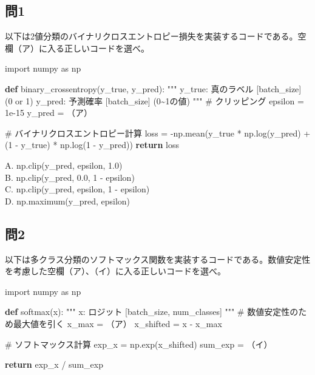 \documentclass[
  letterpaper,
  DIV=11,
  numbers=noendperiod]{scrreprt}
\newenvironment{Shaded}{\begin{snugshade}}{\end{snugshade}}
\newcommand{\CommentTok}[1]{\textcolor[rgb]{0.37,0.37,0.37}{#1}}
\newcommand{\ControlFlowTok}[1]{\textcolor[rgb]{0.00,0.23,0.31}{\textbf{#1}}}
\newcommand{\DecValTok}[1]{\textcolor[rgb]{0.68,0.00,0.00}{#1}}
\newcommand{\FloatTok}[1]{\textcolor[rgb]{0.68,0.00,0.00}{#1}}
\newcommand{\ImportTok}[1]{\textcolor[rgb]{0.00,0.46,0.62}{#1}}
\newcommand{\KeywordTok}[1]{\textcolor[rgb]{0.00,0.23,0.31}{\textbf{#1}}}
\newcommand{\NormalTok}[1]{\textcolor[rgb]{0.00,0.23,0.31}{#1}}
\newcommand{\OperatorTok}[1]{\textcolor[rgb]{0.37,0.37,0.37}{#1}}
\begin{document}
\subsection{問1}\label{ux554f1}

以下は2値分類のバイナリクロスエントロピー損失を実装するコードである。空欄（ア）に入る正しいコードを選べ。

\begin{Shaded}
\begin{Highlighting}[]
\ImportTok{import}\NormalTok{ numpy }\ImportTok{as}\NormalTok{ np}

\KeywordTok{def}\NormalTok{ binary\_crossentropy(y\_true, y\_pred):}
    \CommentTok{"""}
\CommentTok{    y\_true: 真のラベル [batch\_size] (0 or 1)}
\CommentTok{    y\_pred: 予測確率 [batch\_size] (0\textasciitilde{}1の値)}
\CommentTok{    """}
    \CommentTok{\# クリッピング}
\NormalTok{    epsilon }\OperatorTok{=} \FloatTok{1e{-}15}
\NormalTok{    y\_pred }\OperatorTok{=}\NormalTok{ （ア）}
    
    \CommentTok{\# バイナリクロスエントロピー計算}
\NormalTok{    loss }\OperatorTok{=} \OperatorTok{{-}}\NormalTok{np.mean(y\_true }\OperatorTok{*}\NormalTok{ np.log(y\_pred) }\OperatorTok{+}\NormalTok{ (}\DecValTok{1} \OperatorTok{{-}}\NormalTok{ y\_true) }\OperatorTok{*}\NormalTok{ np.log(}\DecValTok{1} \OperatorTok{{-}}\NormalTok{ y\_pred))}
    \ControlFlowTok{return}\NormalTok{ loss}
\end{Highlighting}
\end{Shaded}

A. np.clip(y\_pred, epsilon, 1.0)\\
B. np.clip(y\_pred, 0.0, 1 - epsilon)\\
C. np.clip(y\_pred, epsilon, 1 - epsilon)\\
D. np.maximum(y\_pred, epsilon)

\subsection{問2}\label{ux554f2}

以下は多クラス分類のソフトマックス関数を実装するコードである。数値安定性を考慮した空欄（ア）、（イ）に入る正しいコードを選べ。

\begin{Shaded}
\begin{Highlighting}[]
\ImportTok{import}\NormalTok{ numpy }\ImportTok{as}\NormalTok{ np}

\KeywordTok{def}\NormalTok{ softmax(x):}
    \CommentTok{"""}
\CommentTok{    x: ロジット [batch\_size, num\_classes]}
\CommentTok{    """}
    \CommentTok{\# 数値安定性のため最大値を引く}
\NormalTok{    x\_max }\OperatorTok{=}\NormalTok{ （ア）}
\NormalTok{    x\_shifted }\OperatorTok{=}\NormalTok{ x }\OperatorTok{{-}}\NormalTok{ x\_max}
    
    \CommentTok{\# ソフトマックス計算}
\NormalTok{    exp\_x }\OperatorTok{=}\NormalTok{ np.exp(x\_shifted)}
\NormalTok{    sum\_exp }\OperatorTok{=}\NormalTok{ （イ）}
    
    \ControlFlowTok{return}\NormalTok{ exp\_x }\OperatorTok{/}\NormalTok{ sum\_exp}
\end{Highlighting}
\end{Shaded}
\end{document}

